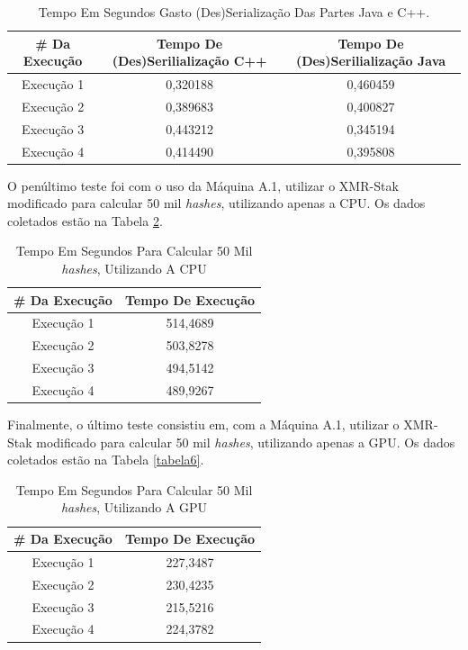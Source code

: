 \begin {table}[H]
\begin{center}
	\begin{tabular}{ |c|c|c| } 
		\hline
		\#  Da Execução & Tempo De (Des)Serilialização C++ & Tempo De (Des)Serilialização Java \\ 
		\hline
		Execução 1 & 0,320188 & 0,460459 \\ 
		\hline
		Execução 2 & 0,389683 & 0,400827 \\ 
		\hline
		Execução 3 & 0,443212 & 0,345194 \\ 
		\hline
		Execução 4 & 0,414490 & 0,395808 \\ 
		\hline
	\end{tabular}
	\caption {Tempo Em Segundos Gasto (Des)Serialização Das Partes Java e C++.} \label{TabelaTempoEscalonadorNovo3} 
\end{center}
\end {table}

O penúltimo teste foi com o uso da Máquina A.1, utilizar o XMR-Stak modificado para calcular 50 mil \textit{hashes}, utilizando apenas a \acrshort{CPU}. Os dados coletados estão na Tabela \ref{TabelaTempoXMR-Stak-CPU}.

\begin {table}[H]
\begin{center}
	\begin{tabular}{ |c|c| } 
		\hline
		\#  Da Execução & Tempo De Execução \\ 
		\hline
		Execução 1 & 514,4689 \\ 
		\hline
		Execução 2 & 503,8278 \\ 
		\hline
		Execução 3 & 494,5142 \\ 
		\hline
		Execução 4 & 489,9267 \\ 
		\hline
	\end{tabular}
	\caption {Tempo Em Segundos Para Calcular 50 Mil \textit{hashes}, Utilizando A \acrshort{CPU}} \label{TabelaTempoXMR-Stak-CPU} 
\end{center}
\end {table}

Finalmente, o último teste consistiu em, com a Máquina A.1, utilizar o XMR-Stak modificado para calcular 50 mil \textit{hashes}, utilizando apenas a \acrshort{GPU}. Os dados coletados estão na Tabela \ref{tabela6}.

\begin {table}[H]
\label{tabela6}
\begin{center}
	\begin{tabular}{ |c|c| } 
		\hline
		\#  Da Execução & Tempo De Execução \\ 
		\hline
		Execução 1 & 227,3487 \\ 
		\hline
		Execução 2 & 230,4235 \\ 
		\hline
		Execução 3 & 215,5216 \\ 
		\hline
		Execução 4 & 224,3782 \\ 
		\hline
	\end{tabular}
	\caption {Tempo Em Segundos Para Calcular 50 Mil \textit{hashes}, Utilizando A \acrshort{GPU}} \label{TabelaTempoXMR-Stak-GPU} 
\end{center}
\end {table}

